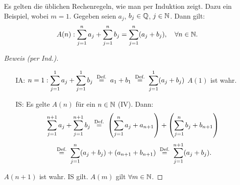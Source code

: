 \documentclass[12pt]{scrreprt}
\begin{document}
\begin{bsp}
\noindent Es gelten die üblichen Rechenregeln, wie man per Induktion zeigt. Dazu ein Beispiel, wobei $m = 1$.
Gegeben seien $a_j$, $b_j\in\mathbb{Q}$, $j\in\mathbb{N}$. Dann gilt:
\[A(n): \sum_{j=1}^n a_j + \sum_{j=1}^n b_j = \sum_{j=1}^n (a_j + b_j),\quad\forall n\in\mathbb{N}.\]

\begin{proof}[Beweis (per Ind.)]
\begin{enumerate}
\item[IA:] $\displaystyle n = 1: \sum_{j=1}^1 a_j + \sum_{j=1}^1 b_j \nach{=}{Def.} a_1 + b_1 \nach{=}{Def.} \sum_{j=1}^1 (a_j + b_j)$ \folgt $A(1)$ ist wahr.
\item[IS:] Es gelte $A(n)$ für ein $n\in\mathbb{N}$ (IV). Dann:
\[\sum_{j=1}^{n+1} a_j + \sum_{j=1}^{n+1} b_j \nach{=}{Def.} \left(\sum_{j=1}^n a_j + a_{n+1}\right) + \left(\sum_{j=1}^n b_j + b_{n+1}\right)\]
\[\nach{=}{Def.} \sum_{j=1}^n (a_j + b_j) + (a_{n+1} + b_{n+1}) \nach{=}{Def.} \sum_{j=1}^{n+1} (a_j + b_j).\]
\end{enumerate}
\noindent\folgt $A(n+1)$ ist wahr. \folgt IS gilt. \folgt $A(m)$ gilt $\forall m\in\mathbb{N}$.
\end{proof}
\end{bsp}
\end{document}
